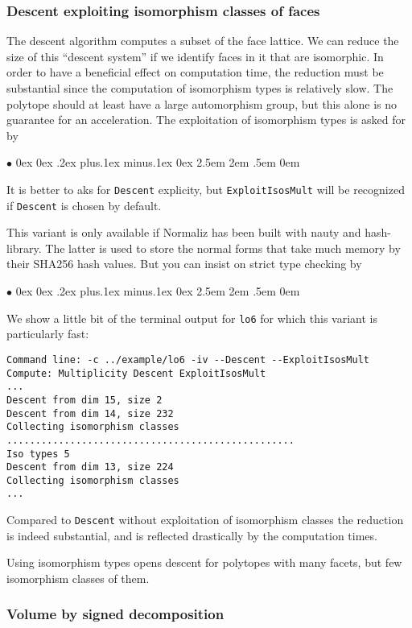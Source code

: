 \documentclass[12pt,a4paper]{scrartcl}
\newcommand{\stdli}{ \topsep0ex \partopsep0ex %
\parsep.2ex plus.1ex minus.1ex \itemsep0ex%
\leftmargin2.5em \labelwidth2em \labelsep.5em \rightmargin0em}%
\renewenvironment{itemize}{\begin{list}{{$\bullet$}}{\stdli}}{\end{list}}
\theoremstyle{definition}
\def\itemtt[#1]{\item[\textbf{\ttt{#1}}]}
\def\ttt{\texttt}
\begin{document}
\subsubsection{Descent exploiting isomorphism classes of faces}\label{ExploitIsosoMult}

The descent algorithm computes a subset of the face lattice. We can reduce the size of this ``descent system'' if we identify faces in it that are isomorphic. In order to have a beneficial effect on computation time, the reduction must be substantial since the computation of isomorphism types is relatively slow. The polytope should at least have a large automorphism group, but this alone is no guarantee for an acceleration. The exploitation of isomorphism types is asked for by
\begin{itemize}
	\itemtt[Descent ExploitIsosMult]
\end{itemize}
It is better to aks for \ttt{Descent} explicity, but \ttt{ExploitIsosMult} will be recognized if \ttt{Descent} is chosen by default.

This variant is only available if Normaliz has been built with nauty and hash-library. The latter is used to store the normal forms that take much memory by their SHA256 hash values. But you can insist on strict type checking by
\begin{itemize}
	\itemtt[StrictIsoTypes]
\end{itemize}

We show a little bit of the terminal output for \ttt{lo6} for which this variant is particularly fast:
\begin{Verbatim}
Command line: -c ../example/lo6 -iv --Descent --ExploitIsosMult 
Compute: Multiplicity Descent ExploitIsosMult 
...
Descent from dim 15, size 2
Descent from dim 14, size 232
Collecting isomorphism classes
..................................................
Iso types 5
Descent from dim 13, size 224
Collecting isomorphism classes
...
\end{Verbatim}
Compared to \ttt{Descent} without exploitation of isomorphism classes the reduction is indeed substantial, and is reflected drastically by the computation times.

Using isomorphism types opens descent for polytopes with many facets, but few isomorphism classes of them.

\subsubsection{Volume by signed decomposition}
\end{document}
